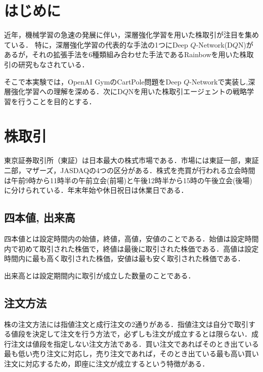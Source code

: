 \documentclass[twocolumn]{jarticle}
\begin{document}

\section{はじめに}
近年，機械学習の急速の発展に伴い，深層強化学習を用いた株取引が注目を集めている．
特に，深層強化学習の代表的な手法の1つにDeep $Q$-Network(D$Q$N)があるが，それの拡張手法を6種類組み合わせた手法であるRainbowを用いた株取引の研究\cite{d_mori}もなされている．

そこで本実験では，OpenAI GymのCartPole問題をDeep $Q$-Networkで実装し,深層強化学習への理解を深める．次にD$Q$Nを用いた株取引エージェントの戦略学習を行うことを目的とする．

\section{株取引}
    東京証券取引所（東証）は日本最大の株式市場である．市場には東証一部，東証二部，マザーズ，JASDAQの4つの区分がある．株式を売買が行われる立会時間は午前9時から11時半の午前立会(前場)と午後12時半から15時の午後立会(後場)に分けられている．年末年始や休日祝日は休業日である．

    \subsection{四本値, 出来高}
    四本値とは設定時間内の始値，終値，高値，安値のことである．始値は設定時間内で初めて取引された株価で，終値は最後に取引された株価である．高値は設定時間内に最も高く取引された株価，安値は最も安く取引された株価である．
    
    出来高とは設定期間内に取引が成立した数量のことである．

    \subsection{注文方法}
    株の注文方法には指値注文と成行注文の2通りがある．指値注文は自分で取引する値段を決定して注文を行う方法で，必ずしも注文が成立するとは限らない．成行注文は値段を指定しない注文方法である．買い注文であればそのとき出ている最も低い売り注文に対応し，売り注文であれば，そのとき出ている最も高い買い注文に対応するため，即座に注文が成立するという特徴がある．
    
\end{document}
